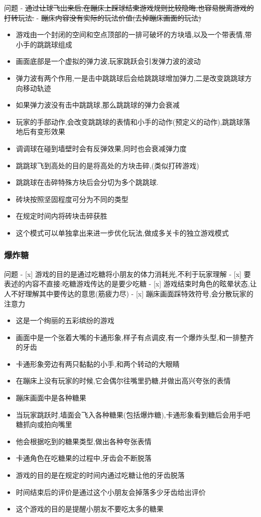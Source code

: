 \documentclass[11pt]{article}
\providecommand{\tightlist}{%
      \setlength{\itemsep}{0pt}\setlength{\parskip}{0pt}}
\begin{document}
    问题 -
\sout{通过让球飞出来后,在蹦床上踩球结束游戏规则比较隐晦,也容易脱离游戏的打转玩法.}
- \sout{蹦床内容没有实际的玩法价值(去掉蹦床画面的玩法)}

    \begin{itemize}
\tightlist
\item
  游戏由一个封闭的空间和空点顶部的一排可破坏的方块墙,以及一个带表情,带小手的跳跳球组成
\item
  画面底部是一个虚拟的弹力波,玩家跳跃会引发弹力波的波动
\item
  弹力波有两个作用,一是击中跳跳球后会给跳跳球增加弹力,二是改变跳跳球方向移动轨迹
\item
  如果弹力波没有击中跳跳球,那么跳跳球的弹力会衰减
\item
  玩家的手部动作,会改变跳跳球的表情和小手的动作(预定义的动作),跳跳球落地后有变形效果
\item
  调调球在碰到墙壁时会有反弹效果,同时也会衰减弹力度
\item
  跳跳球飞到高处的目的是将高处的方块击碎,(类似打砖游戏)
\item
  跳跳球在击碎特殊方块后会分切为多个跳跳球.
\item
  砖块按照坚固程度可分为不同的类型
\item
  在规定时间内将砖块击碎获胜
\item
  这个模式可以单独拿出来进一步优化玩法,做成多关卡的独立游戏模式
\end{itemize}

    

    \subsubsection{爆炸糖}\label{ux7206ux70b8ux7cd6}

    问题 - {[}x{]} 游戏的目的是通过吃糖将小朋友的体力消耗光,不利于玩家理解 -
{[}x{]} 要表述的内容不直接:吃糖游戏传达的是要少吃糖 - {[}x{]}
游戏结束时角色的眩晕状态,让人不好理解其中要传达的意思(筋疲力尽) -
{[}x{]} 蹦床画面踩特效符号,会分散玩家的注意力

    \begin{itemize}
\tightlist
\item
  这是一个绚丽的五彩缤纷的游戏
\item
  画面中是一个张着大嘴的卡通形象,样子有点调皮,有一个爆炸头型,和一排整齐的牙齿
\item
  卡通形象旁边有两只黏黏的小手,和两个转动的大眼睛
\item
  在蹦床上没有玩家的时候,它会偶尔往嘴里扔糖,并做出高兴夸张的表情
\item
  蹦床画面中是各种糖果
\item
  当玩家跳跃时,墙面会飞入各种糖果(包括爆炸糖),卡通形象看到糖后会用手吧糖抓向或拍向嘴里
\item
  他会根据吃到的糖果类型,做出各种夸张表情
\item
  卡通角色在吃糖果的过程中,牙齿会不断脱落
\item
  游戏的目的是在规定的时间内通过吃糖让他的牙齿脱落
\item
  时间结束后的评价是通过这个小朋友会掉落多少牙齿给出评价
\item
  这个游戏的目的是提醒小朋友不要吃太多的糖果
\end{itemize}
\end{document}
